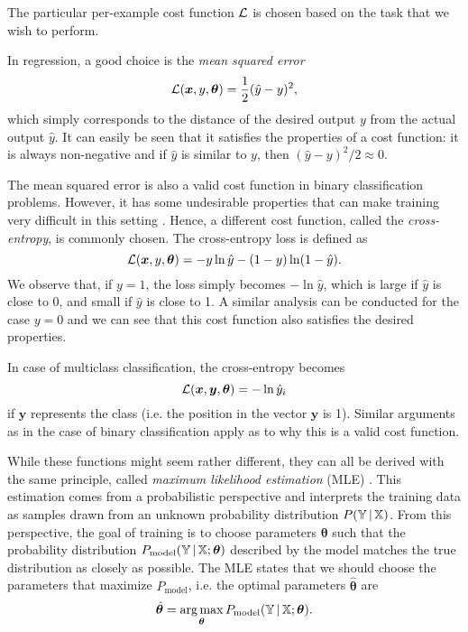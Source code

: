 The particular per-example cost function $\operatorname{\mathcal{L}}$ is chosen based on the task that we wish to perform.

In regression, a good choice is the \emph{mean squared error}
\begin{equation}
\operatorname{\mathcal{L}}(\bm{x}, y, \bm{\theta}) = \frac1{2}(\hat{y}-y)^2,
\end{equation}
which simply corresponds to the distance of the desired output $y$ from the actual output $\hat{y}$. It can easily be seen that it satisfies the properties of a cost function: it is always non-negative and if $\hat{y}$ is similar to $y$, then $(\hat{y}-y)^2/2 \approx 0$.

The mean squared error is also a valid cost function in  binary classification problems. However, it has some undesirable properties that can make training very difficult in this setting \cite[Ch.\,6,\,p.\,178]{DBLP:books/daglib/0040158}. Hence, a different cost function, called the \emph{cross-entropy}, is commonly chosen. The cross-entropy loss is defined as
\begin{equation}
\operatorname{\mathcal{L}}(\bm{x}, y, \bm{\theta}) = -y \ln \hat{y} - (1-y)\ln(1-\hat{y}).
\end{equation}
We observe that, if $y=1$, the loss simply becomes $-\ln\hat{y}$, which is large if $\hat{y}$ is close to 0, and small if $\hat{y}$ is close to 1. A similar analysis can be conducted for the case $y=0$ and we can see that this cost function also satisfies the desired properties.

In case of multiclass classification, the cross-entropy becomes
\begin{equation}
\operatorname{\mathcal{L}}(\bm{x}, \bm{y}, \bm{\theta}) = -\ln \hat{y}_i
\end{equation}
if $\bm{y}$ represents the  class (i.e. the  position in the vector $\bm{y}$ is 1). Similar arguments as in the case of binary classification apply as to why this is a valid cost function.

While these functions might seem rather different, they can all be derived with the same principle, called \emph{maximum likelihood estimation} (MLE) \cite[Ch.\,5,\,pp.\,128-131]{DBLP:books/daglib/0040158}. This estimation comes from a probabilistic perspective and interprets the training data as samples drawn from an unknown probability distribution $P(\mathbb{Y}\,|\,\mathbb{X})$. From this perspective, the goal of training is to choose parameters $\bm{\theta}$ such that the probability distribution $P_{\text{model}}(\mathbb{Y}\,|\,\mathbb{X}; \bm{\theta})$ described by the model matches the true distribution as closely as possible. The MLE states that we should choose the parameters that maximize $P_{\text{model}}$, i.e. the optimal parameters $\hat{\bm{\theta}}$ are
\begin{equation}
\hat{\bm{\theta}} = \operatorname*{arg\,max}_{\bm{\theta}} P_{\text{model}}(\mathbb{Y}\,|\,\mathbb{X}; \bm{\theta}).
\end{equation}

